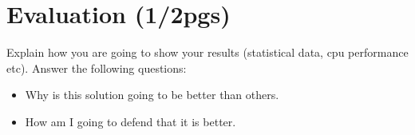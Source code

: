 
% 
% 

\section{Evaluation (1/2pgs)}

Explain how you are going to show your results (statistical data, cpu performance etc). Answer the following questions:
\begin{itemize}
  \item Why is this solution going to be better than others.
  \item How am I going to defend that it is better.
\end{itemize}